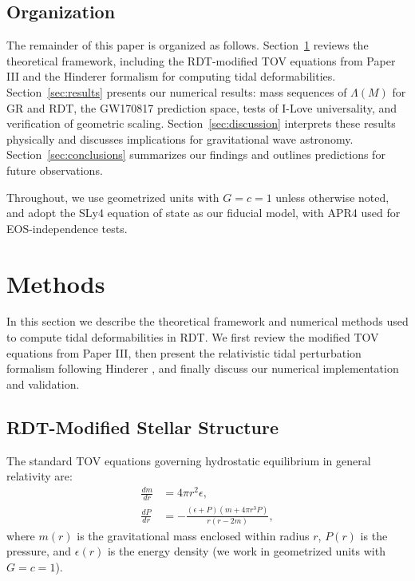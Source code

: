 \documentclass[twocolumn,showpacs,preprintnumbers,amsmath,amssymb,prd]{revtex4-2}
\begin{document}
\subsection{Organization}
\label{sec:intro_organization}

The remainder of this paper is organized as follows. Section~\ref{sec:methods} reviews the theoretical framework, including the RDT-modified TOV equations from Paper III and the Hinderer formalism for computing tidal deformabilities. Section~\ref{sec:results} presents our numerical results: mass sequences of $\Lambda(M)$ for GR and RDT, the GW170817 prediction space, tests of I-Love universality, and verification of geometric scaling. Section~\ref{sec:discussion} interprets these results physically and discusses implications for gravitational wave astronomy. Section~\ref{sec:conclusions} summarizes our findings and outlines predictions for future observations.

Throughout, we use geometrized units with $G = c = 1$ unless otherwise noted, and adopt the SLy4 equation of state \cite{Douchin2001} as our fiducial model, with APR4 \cite{Akmal1998} used for EOS-independence tests.


\section{Methods}
\label{sec:methods}

In this section we describe the theoretical framework and numerical methods used to compute tidal deformabilities in RDT. We first review the modified TOV equations from Paper III, then present the relativistic tidal perturbation formalism following Hinderer \cite{Hinderer2008}, and finally discuss our numerical implementation and validation.

\subsection{RDT-Modified Stellar Structure}
\label{sec:methods_tov}

The standard TOV equations governing hydrostatic equilibrium in general relativity are:
\begin{align}
\frac{dm}{dr} &= 4\pi r^2 \epsilon, \label{eq:tov_mass} \\
\frac{dP}{dr} &= -\frac{(\epsilon + P)(m + 4\pi r^3 P)}{r(r - 2m)}, \label{eq:tov_pressure}
\end{align}
where $m(r)$ is the gravitational mass enclosed within radius $r$, $P(r)$ is the pressure, and $\epsilon(r)$ is the energy density (we work in geometrized units with $G = c = 1$).
\end{document}
